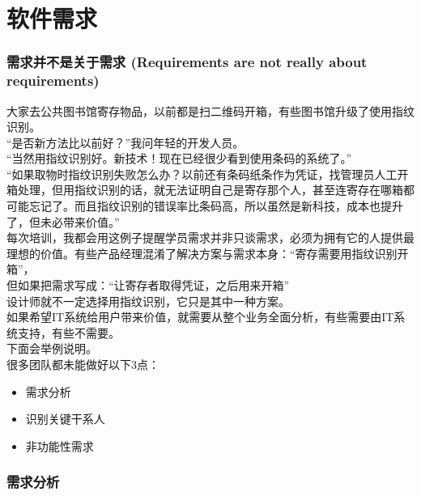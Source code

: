 \chapter{软件需求} %
\hypertarget{ux9700ux6c42ux5e76ux4e0dux662fux5173ux4e8eux9700ux6c42-requirements-are-not-really-about-requirements}{%
\subsection{需求并不是关于需求 (Requirements are not really about
requirements)}\label{ux9700ux6c42ux5e76ux4e0dux662fux5173ux4e8eux9700ux6c42-requirements-are-not-really-about-requirements}}

大家去公共图书馆寄存物品，以前都是扫二维码开箱，有些图书馆升级了使用指纹识别。\\
``是否新方法比以前好？''我问年轻的开发人员。\\
``当然用指纹识别好。新技术！现在已经很少看到使用条码的系统了。''\\
``如果取物时指纹识别失败怎么办？以前还有条码纸条作为凭证，找管理员人工开箱处理，但用指纹识别的话，就无法证明自己是寄存那个人，甚至连寄存在哪箱都可能忘记了。而且指纹识别的错误率比条码高，所以虽然是新科技，成本也提升了，但未必带来价值。''\\
每次培训，我都会用这例子提醒学员需求并非只谈需求，必须为拥有它的人提供最理想的价值。有些产品经理混淆了解决方案与需求本身：``寄存需要用指纹识别开箱''，\\
但如果把需求写成：``让寄存者取得凭证，之后用来开箱''\\
设计师就不一定选择用指纹识别，它只是其中一种方案。\\
如果希望IT系统给用户带来价值，就需要从整个业务全面分析，有些需要由IT系统支持，有些不需要。\\
下面会举例说明。\\
很多团队都未能做好以下3点：

\begin{itemize}
\tightlist
\item
  需求分析
\item
  识别关键干系人
\item
  非功能性需求
\end{itemize}

\hypertarget{ux9700ux6c42ux5206ux6790}{%
\subsection{需求分析}\label{ux9700ux6c42ux5206ux6790}}

